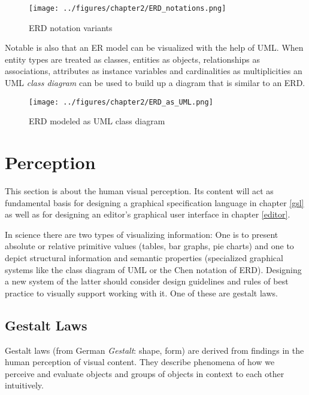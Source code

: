 \documentclass[twoside, openright, 12pt]{book}
\begin{document}
\begin{figure}[htb]
	\centering
	\texttt{[image: ../figures/chapter2/ERD\_notations.png]}
	\caption{ERD notation variants}
	\label{fig:ERD_notations}
\end{figure}

Notable is also that an ER model can be visualized with the help of UML.
When entity types are treated as classes, entities as objects, relationships as associations, attributes as instance variables and cardinalities as multiplicities an UML \textit{class diagram} can be used to build up a diagram that is similar to an ERD.

\begin{figure}[htb]
	\centering
	\texttt{[image: ../figures/chapter2/ERD\_as\_UML.png]}
	\caption{ERD modeled as UML class diagram}
	\label{fig:ERD_as_UML}
\end{figure}




\section{Perception}
\label{perception}
This section is about the human visual perception.
Its content will act as fundamental basis for designing a graphical specification language in chapter \ref{gsl} as well as for designing an editor's graphical user interface in chapter \ref{editor}.

In science there are two types of visualizing information:
One is to present absolute or relative primitive values (tables, bar graphs, pie charts) and one to depict structural information and semantic properties (specialized graphical systems like the class diagram of UML or the Chen notation of ERD).
Designing a new system of the latter should consider design guidelines and rules of best practice to visually support working with it.
One of these are gestalt laws.

\subsection{Gestalt Laws}
\label{gestalt_laws}
Gestalt laws (from German \textit{Gestalt}: shape, form) are derived from findings in the human perception of visual content.
They describe phenomena of how we perceive and evaluate objects and groups of objects in context to each other intuitively.
\end{document}
